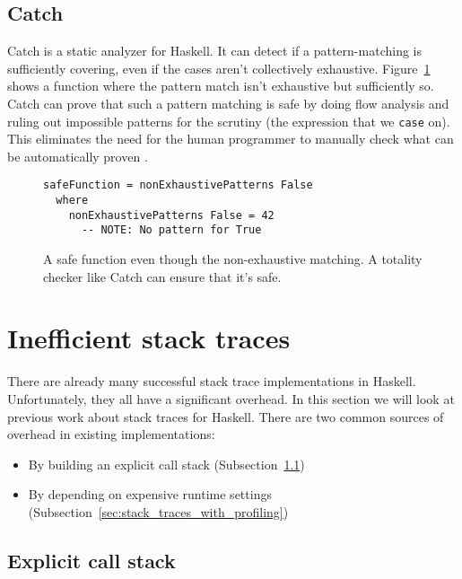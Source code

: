 \subsection{Catch}

Catch is a static analyzer for Haskell. It can detect if a pattern-matching is
sufficiently covering, even if the cases aren't collectively exhaustive. Figure~\ref{fig:catch_example} shows a function where the pattern match isn't exhaustive but
sufficiently so.
Catch can prove that such a pattern
matching is safe by doing flow analysis and ruling out impossible
patterns for the scrutiny (the expression that we \texttt{case} on).
This eliminates the need for the human programmer to manually check what can be
automatically proven \cite{mitchell:catch_2008_9_25}.

\begin{figure}
\begin{mdframed}
      \begin{verbatim}
safeFunction = nonExhaustivePatterns False
  where
    nonExhaustivePatterns False = 42
      -- NOTE: No pattern for True
      \end{verbatim}
      \caption{A safe function even though the non-exhaustive matching. A
        totality checker like Catch can ensure that it's safe.}
      \label{fig:catch_example}
\end{mdframed}
\end{figure}

\section{Inefficient stack traces} \label{sec:overhead_full}

There are already many successful stack trace implementations in
Haskell. Unfortunately, they all have a significant overhead.
In this section we will look at previous work about stack traces for
Haskell. There are two common sources of overhead in existing implementations:

\begin{itemize}
\itemsep1pt\parskip0pt
\item
  By building an explicit call stack (Subsection~\ref{sec:explicit_call_stack})
\item
  By depending on expensive runtime settings (Subsection~\ref{sec:stack_traces_with_profiling})
\end{itemize}

\subsection{Explicit call stack} \label{sec:explicit_call_stack}

